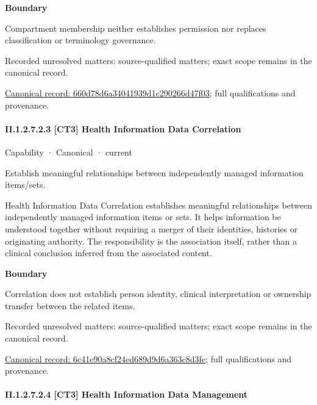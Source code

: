 \textbf{Boundary}



Compartment membership neither establishes permission nor replaces classification or terminology governance.


{\small Recorded unresolved matters: source-qualified matters; exact scope remains in the canonical record.}\par
{\footnotesize \href{../../../../continuum/strategy/capability/660d78d6a34041939d1c290266d47f03.md}{Canonical record: 660d78d6a34041939d1c290266d47f03}; full qualifications and provenance.}\par
\paragraph*{II.1.2.7.2.3 [CT3] Health Information Data Correlation}
\label{navigation:II.1.2.7.2.3}

\label{element:6c41e90a8cf24ed689d9d6a363c8d3fe}
{\small Capability · Canonical · current}\par

Establish meaningful relationships between independently managed information items/sets.



Health Information Data Correlation establishes meaningful relationships between independently managed information items or sets. It helps information be understood together without requiring a merger of their identities, histories or originating authority. The responsibility is the association itself, rather than a clinical conclusion inferred from the associated content.



\textbf{Boundary}



Correlation does not establish person identity, clinical interpretation or ownership transfer between the related items.


{\small Recorded unresolved matters: source-qualified matters; exact scope remains in the canonical record.}\par
{\footnotesize \href{../../../../continuum/strategy/capability/6c41e90a8cf24ed689d9d6a363c8d3fe.md}{Canonical record: 6c41e90a8cf24ed689d9d6a363c8d3fe}; full qualifications and provenance.}\par
\paragraph*{II.1.2.7.2.4 [CT3] Health Information Data Management}
\label{navigation:II.1.2.7.2.4}

